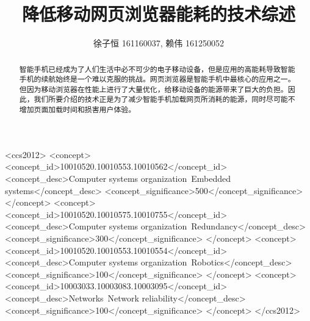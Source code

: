 \documentclass[sigconf]{acmart}
\begin{document}
\begin{CJK}{UTF8}{song}

\title{降低移动网页浏览器能耗的技术综述}

\author{徐子恒 161160037, 赖伟 161250052}



\begin{abstract}

智能手机已经成为了人们生活中必不可少的电子移动设备，但是应用的高能耗导致智能手机的续航始终是一个难以克服的挑战。网页浏览器是智能手机中最核心的应用之一。但因为移动浏览器在性能上进行了大量优化，给移动设备的能源带来了巨大的负担。因此，我们所要介绍的技术正是为了减少智能手机加载网页所消耗的能源，同时尽可能不增加页面加载时间和损害用户体验。

\end{abstract}

%
%
\begin{CCSXML}
<ccs2012>
 <concept>
  <concept_id>10010520.10010553.10010562</concept_id>
  <concept_desc>Computer systems organization~Embedded systems</concept_desc>
  <concept_significance>500</concept_significance>
 </concept>
 <concept>
  <concept_id>10010520.10010575.10010755</concept_id>
  <concept_desc>Computer systems organization~Redundancy</concept_desc>
  <concept_significance>300</concept_significance>
 </concept>
 <concept>
  <concept_id>10010520.10010553.10010554</concept_id>
  <concept_desc>Computer systems organization~Robotics</concept_desc>
  <concept_significance>100</concept_significance>
 </concept>
 <concept>
  <concept_id>10003033.10003083.10003095</concept_id>
  <concept_desc>Networks~Network reliability</concept_desc>
  <concept_significance>100</concept_significance>
 </concept>
</ccs2012>  
\end{CCSXML}



\end{CJK}
\end{document}
